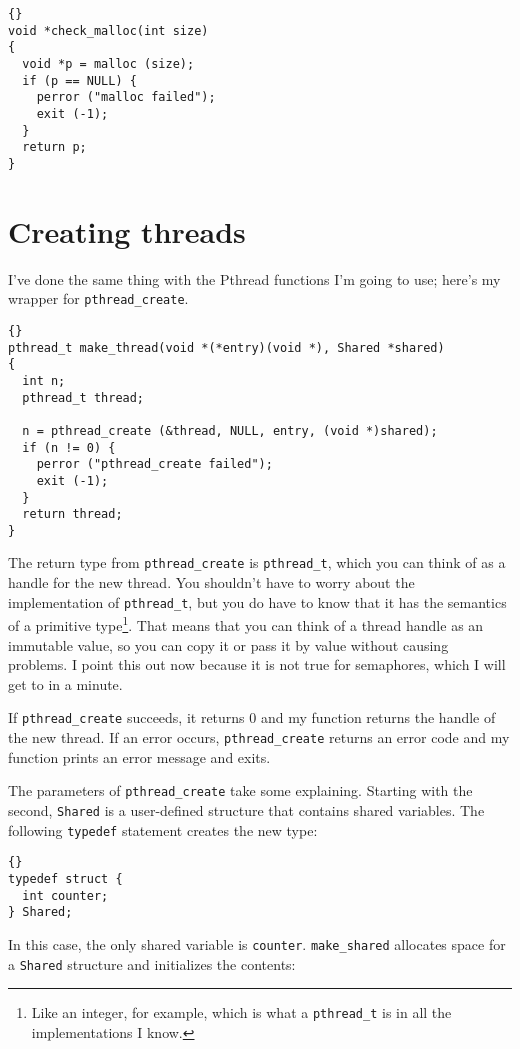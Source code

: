\begin{lstlisting}[title={}]{}
void *check_malloc(int size)
{
  void *p = malloc (size);
  if (p == NULL) {
    perror ("malloc failed");
    exit (-1);
  }
  return p;
}
\end{lstlisting}


\section{Creating threads}

I've done the same thing with the Pthread functions I'm going to use;
here's my wrapper for {\tt pthread\_create}.

\begin{lstlisting}[title={}]{}
pthread_t make_thread(void *(*entry)(void *), Shared *shared)
{
  int n;
  pthread_t thread;

  n = pthread_create (&thread, NULL, entry, (void *)shared);
  if (n != 0) {
    perror ("pthread_create failed");
    exit (-1);
  }
  return thread;
}
\end{lstlisting}

The return type from {\tt pthread\_create} is {\tt pthread\_t},
which you can think of as a handle for the new thread.  You
shouldn't have to worry about the implementation of {\tt pthread\_t},
but you do have to know that it has the semantics of a primitive
type\footnote{Like an integer, for example, which is what a
{\tt pthread\_t} is in all the implementations I know.}.  That
means that you can think of a thread handle as an immutable
value, so you can copy it or pass it by value without causing
problems.  I point this out now because it is not true for
semaphores, which I will get to in a minute.

If {\tt pthread\_create} succeeds, it returns 0 and my function
returns the handle of the new thread.
If an error occurs, {\tt pthread\_create} 
returns an error code and my function prints an error message
and exits.

The parameters of {\tt pthread\_create} take some
explaining.  Starting with the second,
{\tt Shared}
is a user-defined structure that contains shared variables.
The following {\tt typedef} statement creates the new type:

\begin{lstlisting}[title={}]{}
typedef struct {
  int counter;
} Shared;
\end{lstlisting}

In this case, the only shared variable is {\tt counter}.
{\tt make\_shared} allocates
space for a {\tt Shared} structure and initializes the contents:

